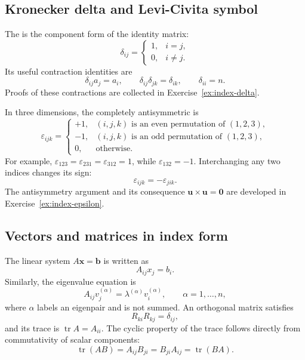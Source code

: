 \subsection{Kronecker delta and Levi-Civita symbol}
The  is the component form of the identity matrix:
\begin{equation}
\delta_{ij}=\begin{cases}
1, & i=j,\\
0, & i\ne j.
\end{cases}
\end{equation}
Its useful contraction identities are
\begin{equation}
\delta_{ij}a_j=a_i,
\qquad
\delta_{ij}\delta_{jk}=\delta_{ik},
\qquad
\delta_{ii}=n.
\end{equation}
Proofs of these contractions are collected in Exercise~\ref{ex:index-delta}.

In three dimensions, the completely antisymmetric  is
\begin{equation}
\varepsilon_{ijk}=\begin{cases}
+1, & (i,j,k)\text{ is an even permutation of }(1,2,3),\\
-1, & (i,j,k)\text{ is an odd permutation of }(1,2,3),\\
0, & \text{otherwise}.
\end{cases}
\end{equation}
For example, $\varepsilon_{123}=\varepsilon_{231}=\varepsilon_{312}=1$, while $\varepsilon_{132}=-1$. Interchanging any two indices changes its sign:
\begin{equation}
\varepsilon_{ijk}=-\varepsilon_{jik}.
\end{equation}
The antisymmetry argument and its consequence $\mathbf{u}\times\mathbf{u}=\mathbf{0}$ are developed in Exercise~\ref{ex:index-epsilon}.

\subsection{Vectors and matrices in index form}
The linear system $A\mathbf{x}=\mathbf{b}$ is written as
\begin{equation}
A_{ij}x_j=b_i.
\end{equation}
Similarly, the eigenvalue equation is
\begin{equation}
A_{ij}v_j^{(\alpha)}=\lambda^{(\alpha)}v_i^{(\alpha)},
\qquad \alpha=1,\ldots,n,
\end{equation}
where $\alpha$ labels an eigenpair and is not summed. An orthogonal matrix satisfies
\begin{equation}
R_{ki}R_{kj}=\delta_{ij},
\end{equation}
and its trace is $\operatorname{tr}A=A_{ii}$. The cyclic property of the trace follows directly from commutativity of scalar components:
\begin{equation}
\operatorname{tr}(AB)=A_{ij}B_{ji}=B_{ji}A_{ij}=\operatorname{tr}(BA).
\end{equation}

